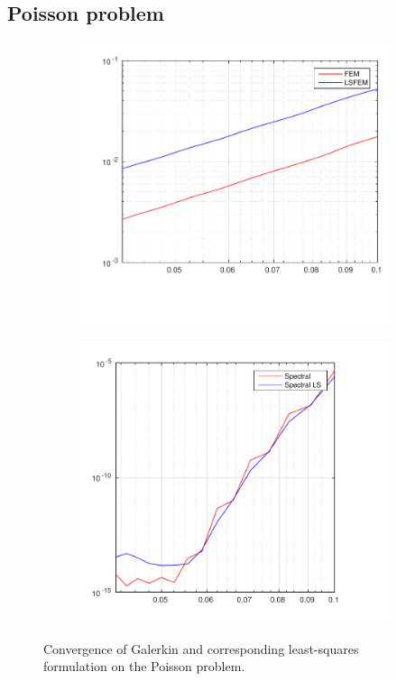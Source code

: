 \subsection{Poisson problem}
%
\begin{figure}[h!]
  \centering
  \begin{subfigure}[b]{0.48\textwidth}
	\includegraphics[width=\textwidth]{Figures/errorFEM-LSFEM.pdf}
  \end{subfigure}%
  \quad
  \begin{subfigure}[b]{0.48\textwidth}
	\includegraphics[width=\textwidth]{Figures/errorSpec-SpecLS.pdf}
  \end{subfigure}
  \vspace{-0.1\baselineskip}
  \caption{Convergence of Galerkin and corresponding least-squares formulation on the Poisson problem.}
  \label{fig:ConvergencePoisson}
\end{figure}
